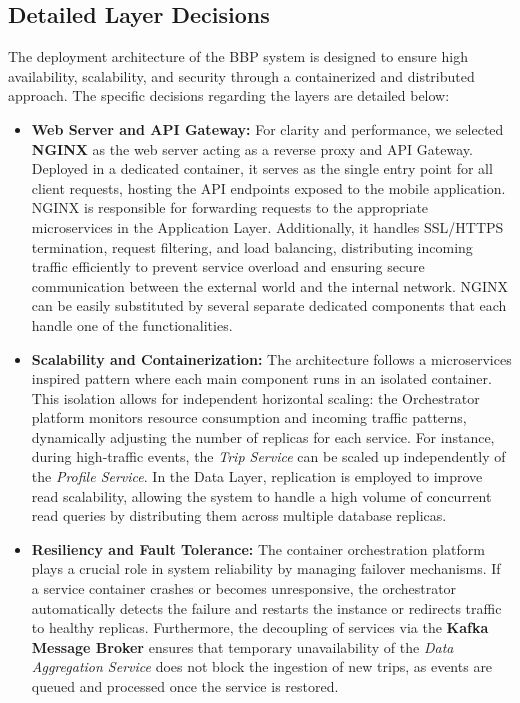\subsection{Detailed Layer Decisions}

The deployment architecture of the BBP system is designed to ensure high availability, scalability, and security through a containerized and distributed approach. The specific decisions regarding the layers are detailed below:

\begin{itemize}

    \item \textbf{Web Server and API Gateway:} 
    For clarity and performance, we selected \textbf{NGINX} as the web server acting as a reverse proxy and API Gateway. Deployed in a dedicated container, it serves as the single entry point for all client requests, hosting the API endpoints exposed to the mobile application. NGINX is responsible for forwarding requests to the appropriate microservices in the Application Layer. Additionally, it handles SSL/HTTPS termination, request filtering, and load balancing, distributing incoming traffic efficiently to prevent service overload and ensuring secure communication between the external world and the internal network. NGINX can be easily substituted by several separate dedicated components that each handle one of the functionalities.


    \item \textbf{Scalability and Containerization:} 
    The architecture follows a microservices inspired pattern where each main component runs in an isolated container. This isolation allows for independent horizontal scaling: the Orchestrator platform monitors resource consumption and incoming traffic patterns, dynamically adjusting the number of replicas for each service. For instance, during high-traffic events, the \textit{Trip Service} can be scaled up independently of the \textit{Profile Service}. In the Data Layer, replication is employed to improve read scalability, allowing the system to handle a high volume of concurrent read queries by distributing them across multiple database replicas.

    \item \textbf{Resiliency and Fault Tolerance:} 
    The container orchestration platform plays a crucial role in system reliability by managing failover mechanisms. If a service container crashes or becomes unresponsive, the orchestrator automatically detects the failure and restarts the instance or redirects traffic to healthy replicas. Furthermore, the decoupling of services via the \textbf{Kafka Message Broker} ensures that temporary unavailability of the \textit{Data Aggregation Service} does not block the ingestion of new trips, as events are queued and processed once the service is restored.


\end{itemize}
